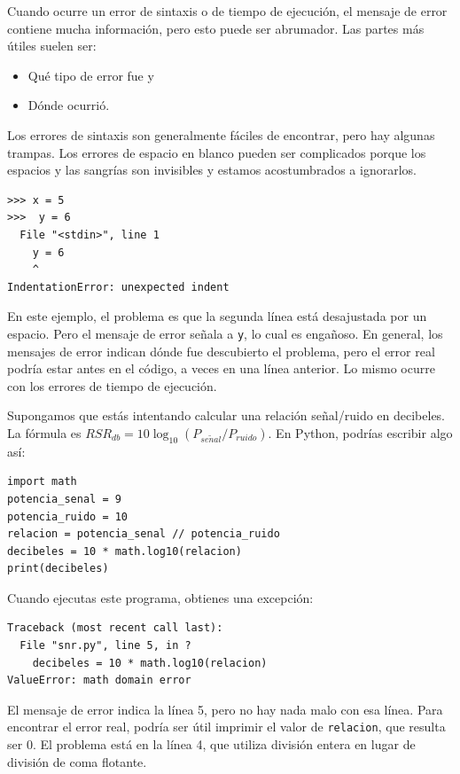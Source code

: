 \documentclass[10pt]{book}
\begin{document}
Cuando ocurre un error de sintaxis o de tiempo de ejecución, el mensaje de error contiene
mucha información, pero esto puede ser abrumador.  Las partes
más útiles suelen ser:

\begin{itemize}

\item Qué tipo de error fue y

\item Dónde ocurrió.

\end{itemize}

Los errores de sintaxis son generalmente fáciles de encontrar, pero hay algunas
trampas.  Los errores de espacio en blanco pueden ser complicados porque los espacios y
las sangrías son invisibles y estamos acostumbrados a ignorarlos.

\begin{verbatim}
>>> x = 5
>>>  y = 6
  File "<stdin>", line 1
    y = 6
    ^
IndentationError: unexpected indent
\end{verbatim}
%
En este ejemplo, el problema es que la segunda línea está desajustada por
un espacio.  Pero el mensaje de error señala a {\tt y}, lo cual es
engañoso.  En general, los mensajes de error indican dónde fue descubierto
el problema, pero el error real podría estar antes en el código,
a veces en una línea anterior. Lo mismo ocurre con los errores de tiempo de ejecución. 

Supongamos que estás intentando
calcular una relación señal/ruido en decibeles.  La fórmula
es $RSR_{db} = 10 \log_{10} (P_{se\tilde{n}al} / P_{ruido})$.  En Python,
podrías escribir algo así:

\begin{verbatim}
import math
potencia_senal = 9
potencia_ruido = 10
relacion = potencia_senal // potencia_ruido
decibeles = 10 * math.log10(relacion)
print(decibeles)
\end{verbatim}
%
Cuando ejecutas este programa, obtienes una excepción:
%

\begin{verbatim}
Traceback (most recent call last):
  File "snr.py", line 5, in ?
    decibeles = 10 * math.log10(relacion)
ValueError: math domain error
\end{verbatim}
%
El mensaje de error indica la línea 5, pero no hay nada
malo con esa línea.  Para encontrar el error real, podría ser
útil imprimir el valor de {\tt relacion}, que resulta
ser 0.  El problema está en la línea 4, que utiliza división entera
en lugar de división de coma flotante.
\end{document}
